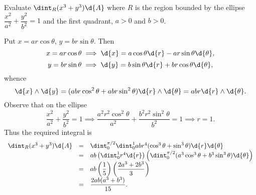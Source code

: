 \begin{exa}
Evaluate $\dint _R (x^3+y^3)\d{A}$ where $R$ is the region bounded by
the ellipse $\dfrac{x^2}{a^2}+\dfrac{y^2}{b^2}=1$ and the first
quadrant, $a>0$ and $b>0$.
\begin{solu}
Put $x=ar\cos \theta$, $y=br\sin \theta$. Then
$$x = ar\cos\theta \implies \d{x} = a\cos\theta\d{r} - ar\sin\theta\d{\theta}, 
$$
$$y = br\sin\theta \implies \d{y} = b\sin\theta\d{r} + br\cos\theta\d{\theta}, 
$$
whence
$$\d{x} \wedge \d{y} = (abr\cos^2\theta + abr\sin^2\theta)\d{r}\wedge\d{\theta} 
= abr\d{r}\wedge\d{\theta}. $$
Observe that on the ellipse
$$\dfrac{x^2}{a^2}+\dfrac{y^2}{b^2}=1 \implies 
\dfrac{a^2r^2\cos^2\theta}{a^2}+\dfrac{b^2r^2\sin^2\theta}{b^2}=1\implies r=1.  
$$
Thus the required integral is
$$\begin{array}{lll}\dint _R (x^3+y^3)\d{A} & = & \dint _0 ^{\pi/2} \dint _0 ^1 
abr^4(\cos ^3\theta + \sin ^3\theta)\d{r}\d{\theta} \\
& = & ab\left(\dint _0 ^1 r^4\d{r}\right)\left( \dint _0 ^{\pi/2}
(a^3\cos ^3\theta + b^3\sin ^3\theta)\d{\theta}\right)\\
& = & ab\left(\dfrac{1}{5}\right)\left(\dfrac{2a^3+2b^3}{3}\right)\\
& = & \dfrac{2ab(a^3+b^3)}{15}.
 \end{array}$$

\end{solu}
\end{exa}
\section*{}

